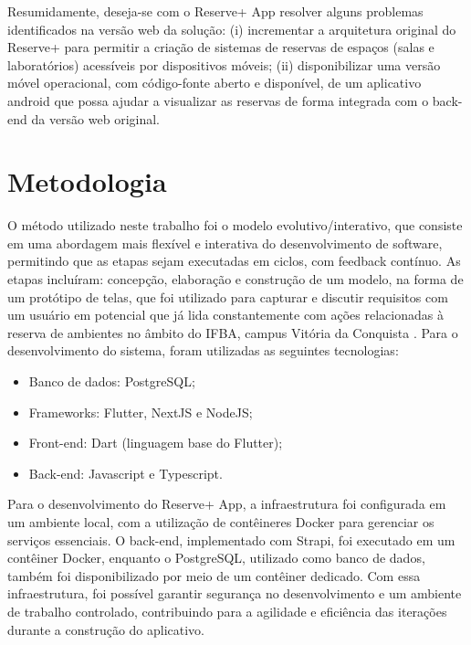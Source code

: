 \documentclass[12pt]{article}
\begin{document}
Resumidamente, deseja-se com o Reserve+ App resolver alguns problemas identificados na versão web da solução: (i) incrementar a arquitetura original  do Reserve+ para permitir a criação de sistemas de reservas de espaços (salas e laboratórios) acessíveis por dispositivos móveis; (ii) disponibilizar uma versão móvel operacional, com código-fonte aberto e disponível, de um aplicativo android que possa ajudar a visualizar as reservas de forma integrada com o back-end da versão web original.

\section{Metodologia} \label{sec:methodology}

O método utilizado neste trabalho foi o modelo evolutivo/interativo, que consiste em uma abordagem mais flexível e interativa do desenvolvimento de software, permitindo que as etapas sejam executadas em ciclos, com feedback contínuo. As etapas incluíram: concepção, elaboração e construção de um modelo, na forma de um protótipo de telas, que foi utilizado para capturar e discutir requisitos com um usuário em potencial que já lida constantemente com ações relacionadas à reserva de ambientes no âmbito do IFBA, campus Vitória da Conquista \cite{appolinario, cervo}. Para o desenvolvimento do sistema, foram utilizadas as seguintes tecnologias:

\begin{itemize}
    \item Banco de dados: PostgreSQL;
    \item Frameworks: Flutter, NextJS e NodeJS;
    \item Front-end: Dart (linguagem base do Flutter);
    \item Back-end: Javascript e Typescript.
\end{itemize}

Para o desenvolvimento do Reserve+ App, a infraestrutura foi configurada em um ambiente local, com a utilização de contêineres Docker para gerenciar os serviços essenciais. O back-end, implementado com Strapi, foi executado em um contêiner Docker, enquanto o PostgreSQL, utilizado como banco de dados, também foi disponibilizado por meio de um contêiner dedicado. Com essa infraestrutura, foi possível garantir segurança no desenvolvimento e um ambiente de trabalho controlado, contribuindo para a agilidade e eficiência das iterações durante a construção do aplicativo.
\end{document}
